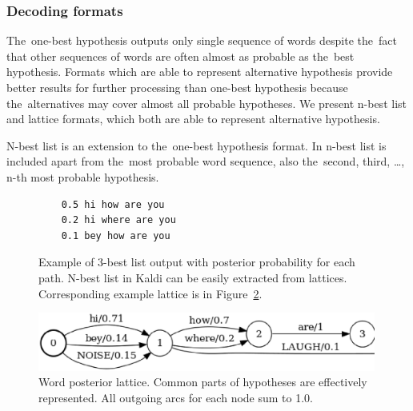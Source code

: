 \subsubsection*{Decoding formats}
The~one-best hypothesis outputs only single sequence of words despite the~fact that other sequences of words are often almost as probable as the~best hypothesis.
Formats which are able to represent alternative hypothesis provide better results for further processing than one-best hypothesis because the~alternatives may cover almost all probable hypotheses.
We present n-best list and lattice formats, which both are able to represent alternative hypothesis.

N-best list is an extension to the~one-best hypothesis format. 
In n-best list is included apart from the~most probable word sequence, also the~second, third, \ldots, n-th most probable hypothesis. 

\begin{figure}[!htp]
    \begin{center}
\begin{verbatim}
    0.5 hi how are you
    0.2 hi where are you
    0.1 bey how are you
\end{verbatim}
\caption{Example of 3-best list output with posterior probability for each path. 
N-best list in Kaldi can be easily extracted from lattices. 
Corresponding example lattice is in Figure~\ref{fig:toy_lat}.}
    \label{fig:nbest} 
    \end{center}
\end{figure}


\begin{figure}[!htp]
    \begin{center}
    \includegraphics[width=30em]{images/toy_lattice.ps}
    \caption{Word posterior lattice. 
        Common parts of hypotheses are effectively represented. 
        All outgoing arcs for each node sum to 1.0. }
    \label{fig:toy_lat} 
    \end{center}
\end{figure}

